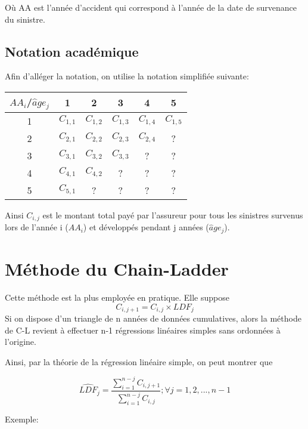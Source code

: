 \documentclass[11pt,french]{report}
\begin{document}
Où AA est l'année d'accident qui correspond à l'année de la date de survenance du sinistre.

\subsection*{Notation académique}
Afin d'alléger la notation, on utilise la notation simplifiée suivante:

\begin{center}
\begin{tabular}{|c|c|c|c|c|c|}
  \hline
   $AA_i$/$\widehat{a}ge_j$ & 1 & 2 & 3 & 4 & 5 \\
  \hline
  1 & $C_{1, 1}$ & $C_{1, 2}$ & $C_{1, 3}$ & $C_{1, 4}$ & $C_{1, 5}$\\
  2 & $C_{2, 1}$ & $C_{2, 2}$ & $C_{2, 3}$ & $C_{2, 4}$ & ?\\
  3 & $C_{3, 1}$ & $C_{3, 2}$ & $C_{3, 3}$ & ? & ?\\ 
  4 & $C_{4, 1}$ & $C_{4, 2}$ & ? & ? & ? \\
  5 & $C_{5, 1}$ & ? & ? & ? & ?\\ 
  \hline
\end{tabular}
\end{center}

Ainsi $C_{i,j}$ est le montant total payé par l'assureur pour tous les sinistres survenus lors de l'année i ($AA_i$)  et développés pendant j années ($\widehat{a}ge_j$).

\section{Méthode du Chain-Ladder}
Cette méthode est la plus employée en pratique. Elle suppose
$$ C_{i,j+1} = C_{i,j} \times LDF_j $$
Si on dispose d'un triangle de n années de données cumulatives, alors la méthode de C-L revient à effectuer n-1 régressions linéaires simples sans ordonnées à l'origine.

Ainsi, par la théorie de la régression linéaire simple, on peut montrer que

$$ \widehat{LDF}_j = \frac{\sum_{i=1}^{n-j} C_{i, j + 1}}{\sum_{i=1}^{n-j} C_{i,j}} ; \forall j = 1,2,...,n-1$$

Exemple:
\end{document}
